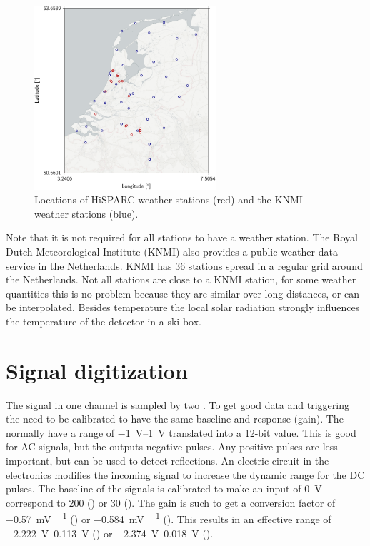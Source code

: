 \begin{figure}
    \centering
    \includegraphics[width=0.6\textwidth]
                    {plots/station/map_weather_knmi}
    \caption{Locations of HiSPARC weather stations (red) and the KNMI weather stations (blue).}
    \label{fig:map_weather_knmi}
\end{figure}

Note that it is not required for all stations to have a weather station. The Royal Dutch Meteorological Institute (KNMI) also provides a public weather data service in the Netherlands. KNMI has 36 stations spread in a regular grid around the Netherlands. Not all \hisparc stations are close to a KNMI station, for some weather quantities this is no problem because they are similar over long distances, or can be interpolated. Besides temperature the local solar radiation strongly influences the temperature of the detector in a ski-box.






\section{Signal digitization}

The signal in one channel is sampled by two \adcs. To get good data and triggering the \adcs need to be calibrated to have the same baseline and response (gain). The \adcs normally have a range of \SIrange{-1}{1}{\volt} translated into a 12-bit value. This is good for AC signals, but the \pmt outputs negative pulses. Any positive pulses are less important, but can be used to detect reflections. An electric circuit in the \hisparc electronics modifies the incoming signal to increase the dynamic range for the DC pulses. The baseline of the signals is calibrated to make an input of \SI{0}{\volt} correspond to \SI{200}{\adc} (\hisparcii) or \SI{30}{\adc} (\hisparciii). The gain is such to get a conversion factor of \SI{-0.57}{\milli\volt\per\adc} (\hisparcii) or \SI{-0.584}{\milli\volt\per\adc} (\hisparciii). This results in an effective range of \SIrange{-2.222}{0.113}{\volt} (\hisparcii) or \SIrange{-2.374}{0.018}{\volt} (\hisparciii).

